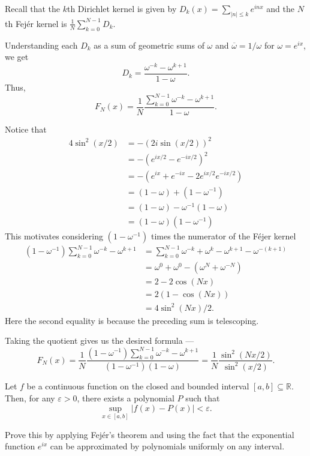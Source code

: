 \documentclass[12 pt, letterpaper]{hmcpset}
\begin{document}
\begin{solution}
	Recall that the $k$th Dirichlet kernel is given by $D_{k}(x) = \sum_{\lvert n \rvert \le k} e^{i n x}$ and the $N$th Fej\'er kernel is $\frac{1}{N} \sum_{k = 0}^{N - 1} D_{k}$.

	Understanding each $D_{k}$ as a sum of geometric sums of $\omega$ and $\overline{\omega} = 1 / \omega$ for $\omega = e^{i x}$, we get
	\[
		D_{k} = \frac{\omega^{-k} - \omega^{k + 1}}{1 - \omega}.
	\]
	Thus,
	\[
		F_{N}(x) = \frac{1}{N} \frac{\sum_{k = 0}^{N - 1} \omega^{-k} - \omega^{k + 1}}{1 - \omega}.
	\]

	Notice that
	\begin{align*}
		4 \sin^{2}{(x / 2)} & = - (2 i \sin{(x / 2)})^{2} \\
				    & = - (e^{i x / 2} - e^{-i x / 2})^{2} \\
				    & = - (e^{i x} + e^{-i x} - 2 e^{i x / 2} e^{-i x / 2}) \\
				    & = (1 - \omega) + (1 - \omega^{-1}) \\
				    & = (1 - \omega) - \omega^{-1}(1 - \omega) \\
				    & = (1 - \omega)(1 - \omega^{-1})
	\end{align*}
	This motivates considering $(1 - \omega^{-1})$ times the numerator of the F\'ejer kernel
	\begin{align*}
		(1 - \omega^{-1}) \sum_{k = 0}^{N - 1} \omega^{-k} - \omega^{k + 1} & = \sum_{k = 0}^{N - 1} \omega^{-k} + \omega^{k} - \omega^{k + 1} - \omega^{-(k + 1)} \\
										    & = \omega^{0} + \omega^{0} - (\omega^{N} + \omega^{-N}) \\
										    & = 2 - 2 \cos{(N x)} \\
										    & = 2(1 - \cos{(N x)}) \\
										    & = 4 \sin^{2}{(N x) / 2}.
	\end{align*}
	Here the second equality is because the preceding sum is telescoping.

	Taking the quotient gives us the desired formula ---
	\[
		F_{N}(x) = \frac{1}{N} \frac{(1 - \omega^{-1}) \sum_{k = 0}^{N - 1} \omega^{-k} - \omega^{k + 1}}{(1 - \omega^{-1}) (1 - \omega)} = \frac{1}{N} \frac{\sin^{2}{(N x / 2)}}{\sin^{2}{(x / 2)}}.
	\]
\end{solution}

\pagebreak

\begin{problem}[S \& S \S 2.6 \#16]
	\begin{theorem}
		Let $f$ be a continuous function on the closed and bounded interval $[a, b] \subseteq \mathbb{R}$. Then, for any $\varepsilon > 0$, there exists a polynomial $P$ such that
		\[
			\sup_{x \in [a, b]} \lvert f(x) - P(x) \rvert < \varepsilon.
		\]
	\end{theorem}
	Prove this by applying Fej\'er's theorem and using the fact that the exponential function $e^{i x}$ can be approximated by polynomials uniformly on any interval.
\end{problem}
\end{document}
